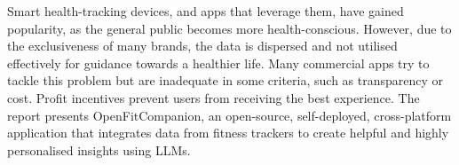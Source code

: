 %
{\singlespacing
Smart health-tracking devices, and apps that leverage them, have gained popularity, as the general public becomes more health-conscious. However, due to the exclusiveness of many brands, the data is dispersed and not utilised effectively for guidance towards a healthier life. Many commercial apps try to tackle this problem but are inadequate in some criteria, such as transparency or cost. Profit incentives prevent users from receiving the best experience. The report presents OpenFitCompanion, an open-source, self-deployed, cross-platform application that integrates data from fitness trackers to create helpful and highly personalised insights using LLMs.
}

